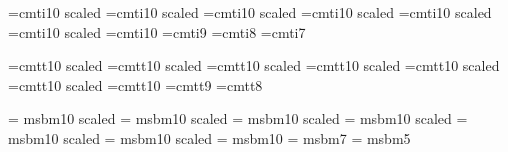 \font \twentyfourit=cmti10 scaled 
\font \twentyit=cmti10 scaled 
\font \seventeenit=cmti10 scaled 
\font \fourteenit=cmti10 scaled 
\font \twelveit=cmti10 scaled 
\font \elevenit=cmti10 scaled \magstephalf
\font \tenit=cmti10
\font \nineit=cmti9
\font \eightit=cmti8
\font \sevenit=cmti7

\font \twentyfourtt=cmtt10 scaled 
\font \twentytt=cmtt10 scaled 
\font \seventeentt=cmtt10 scaled 
\font \fourteentt=cmtt10 scaled 
\font \twelvett=cmtt10 scaled 
\font \eleventt=cmtt10 scaled \magstephalf
\font \tentt=cmtt10
\font \ninett=cmtt9
\font \eighttt=cmtt8


\font \twentyfourbm = msbm10 scaled 
\font \twentybm = msbm10 scaled 
\font \seventeenbm = msbm10 scaled 
\font \fourteenbm = msbm10 scaled 
\font \twelvebm = msbm10 scaled 
\font \elevenbm = msbm10 scaled \magstephalf
\font \tenbm = msbm10
\font \sevenbm = msbm7
\font \fivebm = msbm5


\newskip\ttglue
\def\twentypoint{\def\rm{\fam0\twentyrm} %
  \textfont0 = \twentyrm \scriptfont0 = \fourteenrm \scriptscriptfont0 = \tenrm
  \textfont1 = \twentyi  \scriptfont1 = \fourteeni  \scriptscriptfont1 = \teni
  \textfont2 = \twentysy \scriptfont2 = \fourteensy \scriptscriptfont2 = \tensy
  \textfont3 = \twentyex \scriptfont3 = \twentyex   \scriptscriptfont3 =
\twentyex
  \def\it{\fam\itfam\twentyit}
  \textfont\itfam = \twentyit
  \def\sl{\fam\slfam\twentysl}
  \textfont\slfam = \twentysl
  \def\tt{\fam\ttfam\twentytt}
  \textfont\ttfam = \twentytt
  \def\bf{\fam\bffam\twentybf}
  \textfont\bffam = \twentybf
  \scriptfont\bffam = \fourteenbf
  \scriptscriptfont\bffam = \tenbf
  \tt \ttglue = .5em plus.25em minus.15em
  \normalbaselineskip = 25pt
  \setbox\strutbox = \hbox{\vrule height20pt depth5pt width0pt}
  \normalbaselines\rm}

